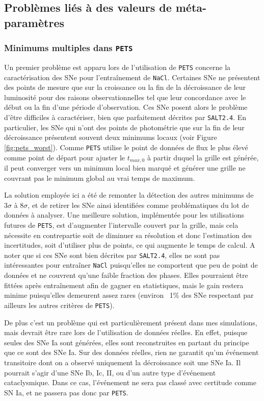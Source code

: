 \documentclass{book}
\def\pets{\texttt{PETS}\xspace}
\def\nacl{\texttt{NaCl}\xspace}
\def\saltd{\texttt{SALT2.4}\xspace}
\begin{document}
\subsection{Problèmes liés à des valeurs de méta-paramètres}

\subsubsection{Minimums multiples dans \pets}
\label{sec:min_mult}

Un premier problème est apparu lors de l'utilisation de \pets concerne la caractérisation des SNe pour l'entraînement de \nacl. Certaines SNe ne présentent des points de mesure que sur la croissance ou la fin de la décroissance de leur luminosité pour des raisons observationnelles tel que leur concordance avec le début ou la fin d'une période d'observation. Ces SNe posent alors le problème d'être difficiles à caractériser, bien que parfaitement décrites par \saltd. En particulier, les SNe qui n'ont des points de photométrie que sur la fin de leur décroissance présentent souvent deux minimums locaux (voir Figure \ref{fig:pets_worst}). Comme \pets utilise le point de données de flux le plus élevé comme point de départ pour ajuster le $t_{max, 0}$ à partir duquel la grille est générée, il peut converger vers un minimum local bien marqué et générer une grille ne couvrant pas le minimum global au vrai temps de maximum.

La solution employée ici a été de remonter la détection des autres minimums de $3\sigma$ à $8\sigma$, et de retirer les SNe ainsi identifiées comme problématiques du lot de données à analyser. Une meilleure solution, implémentée pour les utilisations futures de \pets, est d'augmenter l'intervalle couvert par la grille, mais cela nécessite en contrepartie soit de diminuer sa résolution et donc l'estimation des incertitudes, soit d'utiliser plus de points, ce qui augmente le temps de calcul. A noter que si ces SNe sont bien décrites par \saltd, elles ne sont pas intéressantes pour entraîner \nacl puisqu'elles ne comportent que peu de point de données et ne couvrent qu'une faible fraction des phases. Elles pourraient être fittées après entraînement afin de gagner en statistiques, mais le gain restera minime puisqu'elles demeurent assez rares (environ ~1\% des SNe respectant par ailleurs les autres critères de \pets).

De plus c'est un problème qui est particulièrement présent dans mes simulations, mais devrait être rare lors de l'utilisation de données réelles. En effet, puisque seules des SNe Ia sont générées, elles sont reconstruites en partant du principe que ce sont des SNe Ia. Sur des données réelles, rien ne garantit qu'un événement transitoire dont on a observé uniquement la décroissance soit une SNe Ia. Il pourrait s'agir d'une SNe Ib, Ic, II, ou d'un autre type d'événement cataclysmique. Dans ce cas, l'événement ne sera pas classé avec certitude comme SN Ia, et ne passera pas donc par \pets.
 
\end{document}
